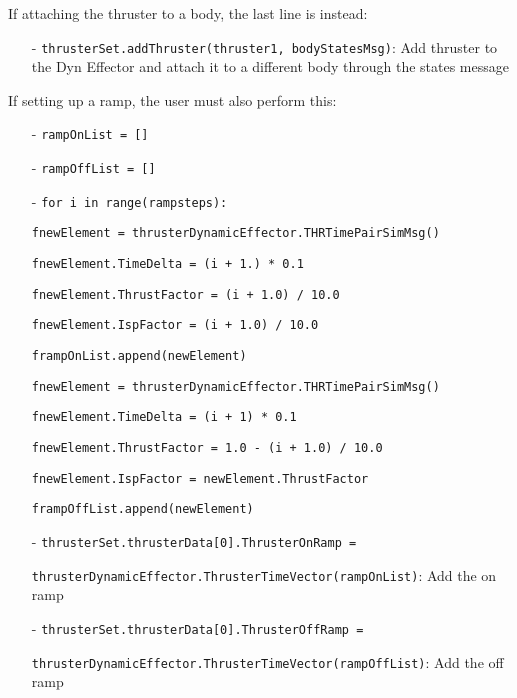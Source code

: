 If attaching the thruster to a body, the last line is instead:

\begin{itemize}
     \item[-]   \texttt{thrusterSet.addThruster(thruster1, bodyStatesMsg)}: Add thruster to the Dyn Effector and attach it to a different body through the states message
\end{itemize}

If setting up a ramp, the user must also perform this:

\begin{itemize}
 \item[-]      \texttt{rampOnList = []}
 \item[-]      \texttt{rampOffList = []}

 \item[-]      \texttt{for i in range(rampsteps):}

\hspace{2cm}\texttt{fnewElement = thrusterDynamicEffector.THRTimePairSimMsg()}

\hspace{2cm}\texttt{fnewElement.TimeDelta = (i + 1.) * 0.1}

\hspace{2cm}\texttt{fnewElement.ThrustFactor = (i + 1.0) / 10.0}

\hspace{2cm}\texttt{fnewElement.IspFactor = (i + 1.0) / 10.0}

\hspace{2cm}\texttt{frampOnList.append(newElement)}

\hspace{2cm}\texttt{fnewElement = thrusterDynamicEffector.THRTimePairSimMsg()}

\hspace{2cm}\texttt{fnewElement.TimeDelta = (i + 1) * 0.1}

\hspace{2cm}\texttt{fnewElement.ThrustFactor = 1.0 - (i + 1.0) / 10.0}

 \hspace{2cm}\texttt{fnewElement.IspFactor = newElement.ThrustFactor}

 \hspace{2cm}\texttt{frampOffList.append(newElement)}

 \item[-]      \texttt{thrusterSet.thrusterData[0].ThrusterOnRamp =}

  \texttt{thrusterDynamicEffector.ThrusterTimeVector(rampOnList)}: Add the on ramp
 \item[-]      \texttt{thrusterSet.thrusterData[0].ThrusterOffRamp =}

 \texttt{thrusterDynamicEffector.ThrusterTimeVector(rampOffList)}: Add the off ramp
\end{itemize}

